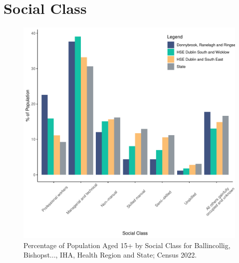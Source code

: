 \documentclass{article}
\begin{document}
\section{Social Class}\label{sect:SC}
\begin{figure}[H]
	\centering
	\includegraphics[width = 140mm]{../figures/SocialClassED.pdf}
	\caption{Percentage of Population Aged 15+ by Social Class for Ballincollig, Bishopst..., IHA, Health Region and State; Census 2022.}
	\label{fig:vbnv}
	\end{figure}
\end{document}
